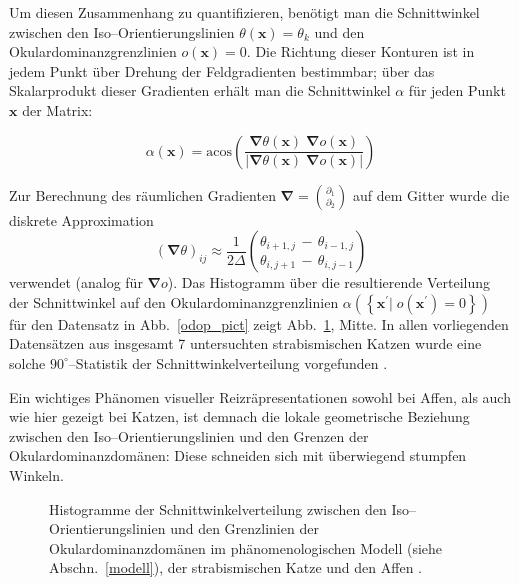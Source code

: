 Um diesen Zusammenhang zu quantifizieren, benötigt man die Schnittwinkel
zwischen den Iso--Orientierungslinien $\theta(\mathbf{x})=\theta_k$ und den
Okulardominanzgrenzlinien $o(\mathbf{x}) = 0$. Die Richtung dieser
Konturen ist in jedem Punkt über Drehung der Feldgradienten bestimmbar;
über das Skalarprodukt dieser Gradienten erhält man die Schnittwinkel
$\alpha$ für jeden Punkt $\mathbf{x}$ der Matrix:

\begin{equation*}
    \alpha(\mathbf{x})=\text{acos}\!\left(\frac{\pmb\nabla\theta(\mathbf{x})
        \;\pmb\nabla o(\mathbf{x})}{\vert\pmb\nabla\theta(\mathbf{x})\;\pmb\nabla
        o(\mathbf{x})\vert}\right)
\end{equation*}

Zur Berechnung des räumlichen Gradienten $\pmb\nabla =
{\binom{\partial_1}{\partial_2}}$ auf dem Gitter wurde die diskrete
Approximation
\begin{equation*}
    (\pmb\nabla\theta)_{ij}\approx\frac{1}{2\Delta}{\binom{\theta_{i+1,j}\,-\,\theta_{i-1,j}}{\theta_{i,j+1}\,-\,\theta_{i,j-1}}}
\end{equation*}
verwendet (analog für $\pmb\nabla o$). Das Histogramm über die
resultierende Verteilung der Schnittwinkel auf den
Okulardominanzgrenzlinien $\alpha(\left\{\mathbf{x}^\prime\vert\;
o(\mathbf{x}^\prime)=0\right\})$ für den Datensatz in Abb.~\ref{odop_pict}
zeigt Abb.~\ref{odop_hist}, Mitte. In allen vorliegenden Datensätzen aus
insgesamt 7 untersuchten strabismischen Katzen wurde eine solche
$90^\circ$--Statistik der Schnittwinkelverteilung vorgefunden
\parencite[siehe][]{loewel:1996}.

Ein wichtiges Phänomen visueller Reizräpresentationen sowohl bei Affen,
als auch wie hier gezeigt bei Katzen, ist demnach die lokale geometrische
Beziehung zwischen den Iso--Orientierungslinien und den Grenzen der
Okulardominanzdomänen: Diese schneiden sich mit überwiegend stumpfen
Winkeln.

\begin{figure}[t]
    \centering
    \caption{Histogramme der Schnittwinkelverteilung zwischen den
    Iso--Orien\-tier\-ungs\-linien und den Grenzlinien der Okulardominanzdomänen
    im phänomenologischen Modell (siehe Abschn.~\ref{modell}), der
    strabismischen Katze \parencite[hier für den in Abb.~\ref{odop_pict} gezeigten Datensatz; weitere siehe][]{loewel:1996} und den Affen
        \parencite[Daten aus][]{oby:1993b}.}
    \label{odop_hist}
\end{figure}

